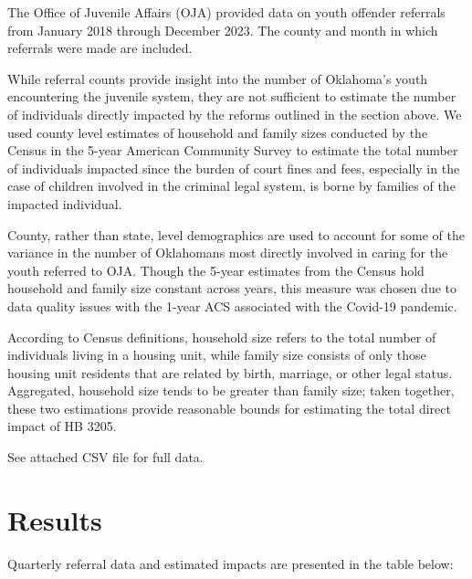 \documentclass[
  letterpaper,
  DIV=11,
  numbers=noendperiod]{scrartcl}
\begin{document}
The Office of Juvenile Affairs (OJA) provided data on youth offender
referrals from January 2018 through December 2023. The county and month
in which referrals were made are included.

While referral counts provide insight into the number of Oklahoma's
youth encountering the juvenile system, they are not sufficient to
estimate the number of individuals directly impacted by the reforms
outlined in the section above. We used county level estimates of
household and family sizes conducted by the Census in the 5-year
American Community Survey to estimate the total number of individuals
impacted since the burden of court fines and fees, especially in the
case of children involved in the criminal legal system, is borne by
families of the impacted individual.

County, rather than state, level demographics are used to account for
some of the variance in the number of Oklahomans most directly involved
in caring for the youth referred to OJA. Though the 5-year estimates
from the Census hold household and family size constant across years,
this measure was chosen due to data quality issues with the 1-year ACS
associated with the Covid-19 pandemic.

According to Census definitions, household size refers to the total
number of individuals living in a housing unit, while family size
consists of only those housing unit residents that are related by birth,
marriage, or other legal status. Aggregated, household size tends to be
greater than family size; taken together, these two estimations provide
reasonable bounds for estimating the total direct impact of HB 3205.

See attached CSV file for full data.

\hypertarget{results}{%
\section{Results}\label{results}}

Quarterly referral data and estimated impacts are presented in the table
below:
\end{document}

